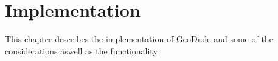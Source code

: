\chapter{Implementation}
This chapter describes the implementation of GeoDude and some of the considerations aswell as the functionality.
